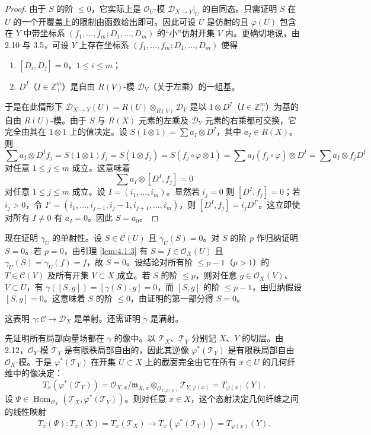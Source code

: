 \begin{proof}
由于 $S$ 的阶 $\le 0$，它实际上是 $\mathcal{O}_U$-模 $\mathcal{D}_{X\to Y}|_U$ 的自同态。只需证明 $S$ 在 $U$ 的一个开覆盖上的限制由函数给出即可。因此可设 $U$ 是仿射的且 $\varphi(U)$ 包含在 $Y$ 中带坐标系
$(f_1,\dots,f_m;D_1,\dots,D_m)$ 的“小”仿射开集 $V$ 内。更确切地说，由 2.10 与 3.5，可设 $Y$ 上存在坐标系
$(f_1,\dots,f_m;D_1,\dots,D_m)$ 使得
\begin{enumerate}[label=(\roman*)]
  \item $[D_i,D_j]=0$，$1\le i\le m$；
  \item $D^I$（$I\in\mathbb{Z}_+^m$）是自由 $R(V)$-模 $\mathcal{D}_V$（关于左乘）的一组基。
\end{enumerate}
于是在此情形下 $\mathcal{D}_{X\to Y}(U)=R(U)\otimes_{R(V)}\mathcal{D}_V$ 是以 $1\otimes D^I$（$I\in\mathbb{Z}_+^m$）为基的自由 $R(U)$-模。由于 $S$ 与 $R(X)$ 元素的左乘及 $\mathcal{D}_Y$ 元素的右乘都可交换，它完全由其在 $1\otimes 1$ 上的值决定。设
$S(1\otimes 1)=\sum a_I\otimes D^I$，其中 $a_I\in R(X)$。则
$$\sum a_I\otimes D^I f_j=S(1\otimes 1)f_j=S(1\otimes f_j)=S(f_j\circ\varphi\otimes 1)
=\sum a_I(f_j\circ\varphi)\otimes D^I=\sum a_I\otimes f_jD^I$$
对任意 $1\le j\le m$ 成立。这意味着
$$\sum a_I\otimes[D^I,f_j]=0$$
对任意 $1\le j\le m$ 成立。设 $I=(i_1,\dots,i_m)$。显然若 $i_j=0$ 则 $[D^I,f_j]=0$；若 $i_j>0$，令
$I'=(i_1,\dots,i_{j-1},i_j-1,i_{j+1},\dots,i_m)$，则 $[D^I,f_j]=i_jD^{I'}$。这立即使对所有 $I\ne 0$ 有 $a_I=0$。因此 $S=a_0$。
\end{proof}

现在证明 $\gamma_U$ 的单射性。设 $S\in\mathcal{C}(U)$ 且 $\gamma_U(S)=0$。对 $S$ 的阶 $p$ 作归纳证明 $S=0$。若 $p=0$，由引理 \ref{lem:4.1.3} 有 $S=f\in\mathcal{O}_X(U)$ 且 $\gamma_U(S)=\gamma_U(f)=f$，故 $S=0$。设结论对所有阶 $\le p-1$（$p>1$）的 $T\in\mathcal{C}(V)$ 及所有开集 $V\subset X$ 成立。若 $S$ 的阶 $\le p$，则对任意 $g\in\mathcal{O}_X(V)$、$V\subset U$，有
$\gamma([S,g])=[\gamma(S),g]=0$，而 $[S,g]$ 的阶 $\le p-1$，由归纳假设 $[S,g]=0$。这意味着 $S$ 的阶 $\le 0$，由证明的第一部分得 $S=0$。

这表明 $\gamma:\mathcal{C}\to\mathcal{D}_X$ 是单射。还需证明 $\gamma$ 是满射。

先证明所有局部向量场都在 $\gamma$ 的像中。以 $\mathcal{T}_X$、$\mathcal{T}_Y$ 分别记 $X$、$Y$ 的切层。由 2.12，$\mathcal{O}_Y$-模 $\mathcal{T}_Y$ 是有限秩局部自由的，因此其逆像 $\varphi^*(\mathcal{T}_Y)$ 是有限秩局部自由 $\mathcal{O}_X$-模。于是 $\varphi^*(\mathcal{T}_Y)$ 在开集 $U\subset X$ 上的截面完全由它在所有 $x\in U$ 的几何纤维中的像决定：
$$T_x(\varphi^*(\mathcal{T}_Y))=\mathcal{O}_{X,x}/\mathfrak{m}_{X,x}\otimes_{\mathcal{O}_{Y,\varphi(x)}}\mathcal{T}_{Y,\varphi(x)}=T_{\varphi(x)}(Y).$$
设 $\Psi\in\operatorname{Hom}_{\mathcal{O}_X}(\mathcal{T}_X,\varphi^*(\mathcal{T}_Y))$。则对任意 $x\in X$，这个态射决定几何纤维之间的线性映射
$$T_x(\Psi):T_x(X)=T_x(\mathcal{T}_X)\longrightarrow T_x(\varphi^*(\mathcal{T}_Y))=T_{\varphi(x)}(Y).$$

